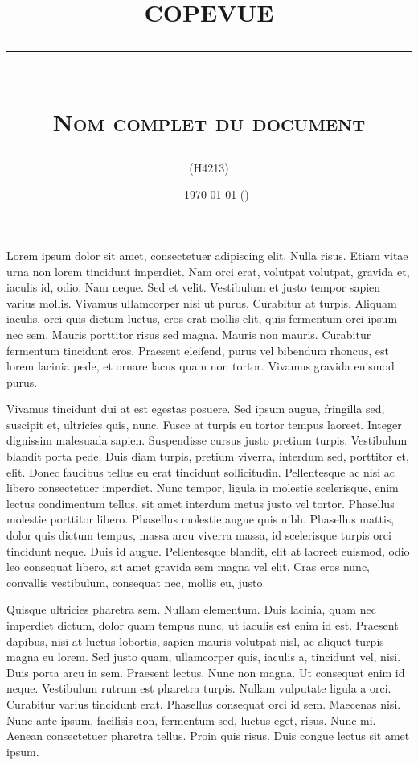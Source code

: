 \documentclass[a4paper, 11pt, draft]{report}
\title{\textbf{COPEVUE}\\
\rule{\textwidth}{1pt}{}\\
\Huge{\textsc{Nom complet du document}}}
\author{\docauthor{} (H4213)}
\date{\docname{} --- \today{} (\docstatus{})}
\begin{document}
\maketitle

\tableofcontents

\pagebreak

Lorem ipsum dolor sit amet, consectetuer adipiscing elit. Nulla risus. Etiam vitae urna non lorem tincidunt imperdiet. Nam orci erat, volutpat volutpat, gravida et, iaculis id, odio. Nam neque. Sed et velit. Vestibulum et justo tempor sapien varius mollis. Vivamus ullamcorper nisi ut purus. Curabitur at turpis. Aliquam iaculis, orci quis dictum luctus, eros erat mollis elit, quis fermentum orci ipsum nec sem. Mauris porttitor risus sed magna. Mauris non mauris. Curabitur fermentum tincidunt eros. Praesent eleifend, purus vel bibendum rhoncus, est lorem lacinia pede, et ornare lacus quam non tortor. Vivamus gravida euismod purus.

Vivamus tincidunt dui at est egestas posuere. Sed ipsum augue, fringilla sed, suscipit et, ultricies quis, nunc. Fusce at turpis eu tortor tempus laoreet. Integer dignissim malesuada sapien. Suspendisse cursus justo pretium turpis. Vestibulum blandit porta pede. Duis diam turpis, pretium viverra, interdum sed, porttitor et, elit. Donec faucibus tellus eu erat tincidunt sollicitudin. Pellentesque ac nisi ac libero consectetuer imperdiet. Nunc tempor, ligula in molestie scelerisque, enim lectus condimentum tellus, sit amet interdum metus justo vel tortor. Phasellus molestie porttitor libero. Phasellus molestie augue quis nibh. Phasellus mattis, dolor quis dictum tempus, massa arcu viverra massa, id scelerisque turpis orci tincidunt neque. Duis id augue. Pellentesque blandit, elit at laoreet euismod, odio leo consequat libero, sit amet gravida sem magna vel elit. Cras eros nunc, convallis vestibulum, consequat nec, mollis eu, justo.

Quisque ultricies pharetra sem. Nullam elementum. Duis lacinia, quam nec imperdiet dictum, dolor quam tempus nunc, ut iaculis est enim id est. Praesent dapibus, nisi at luctus lobortis, sapien mauris volutpat nisl, ac aliquet turpis magna eu lorem. Sed justo quam, ullamcorper quis, iaculis a, tincidunt vel, nisi. Duis porta arcu in sem. Praesent lectus. Nunc non magna. Ut consequat enim id neque. Vestibulum rutrum est pharetra turpis. Nullam vulputate ligula a orci. Curabitur varius tincidunt erat. Phasellus consequat orci id sem. Maecenas nisi. Nunc ante ipsum, facilisis non, fermentum sed, luctus eget, risus. Nunc mi. Aenean consectetuer pharetra tellus. Proin quis risus. Duis congue lectus sit amet ipsum.
\end{document}
